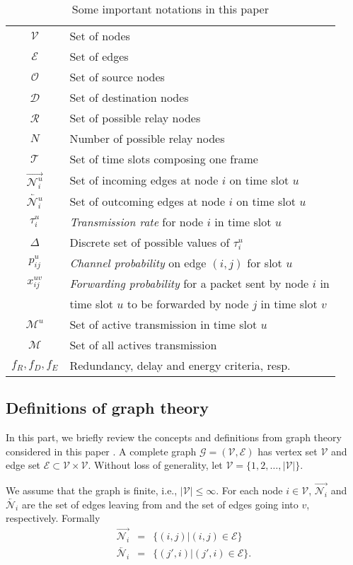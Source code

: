 \documentclass[a4paper]{article}
\newcommand{\T}{\mathcal{T}}
\newcommand{\M}{\mathcal{M}}
\newcommand{\V}{\mathcal{V}}
\newcommand{\Orig}{\mathcal{O}}
\newcommand{\D}{\mathcal{D}}
\newcommand{\E}{\mathcal{E}}
\newcommand{\R}{\mathcal{R}}
\newcommand{\Nout}[2]{ \overrightarrow{ \mathcal{N}_{#1}^{#2} } }
\newcommand{\Nin}[2]{ \overleftarrow{ \mathcal{N}_{#1}^{#2} } }
\begin{document}
\begin{table} 
\caption{Some important notations in this paper} 
\centering
\label{tab:notations}
\begin{tabular}{| c | l |}
\hline
$\V$			& Set of nodes \\
$\E$		& Set of edges \\
$\Orig$		& Set of source nodes \\
$\D$		& Set of destination nodes\\
$\R$		& Set of possible relay nodes\\
$N$				& Number of possible relay nodes\\
$\T$				& Set of time slots composing one frame\\
$\Nout{i}{u}$ 		& Set of incoming edges at node $i$  on time slot $u$\\
$\Nin{i}{u}$ 		& Set of outcoming edges at node $i$ on time slot $u$\\  
$\tau^u_i$		& \emph{Transmission rate} for node $i$ in time slot $u$ \\
$\Delta$			& Discrete set of possible values of  $\tau^u_i$\\			
$p_{ij}^u$ 		& \emph{Channel probability} on edge $(i,j)$ for slot $u$ \\ 
$x_{ij}^{uv}$		& \emph{Forwarding probability} for a packet sent by node $i$ in \\
				&  time slot $u$ to be forwarded by node $j$ in time slot $v$\\
$\M^u$			& Set of active transmission in time slot $u$\\
$\M$				& Set of all actives transmission \\
$f_R, f_D, f_E$		& Redundancy, delay and energy criteria, resp. \\
\hline

\end{tabular}
\end{table}

\subsection{Definitions of graph theory}

In this part, we briefly review the concepts and definitions from graph theory considered in this paper \cite{graph}. 
A complete graph $\mathcal{G=(V,E)}$ has vertex set $\V$ and edge set $\mathcal{E \subset V \times V}$. Without loss of generality, let
$ \V = \{1, 2, \dots, |\V| \} $.

We assume that the graph is finite, i.e., $|\V| \leq \infty$. 
For each node $i \in \V$, $\Nout{i}{}$ and $\Nin{i}{}$ are the set of edges leaving from and the set of edges going into $v$, respectively. Formally 
\begin{eqnarray*}
\Nout{i}{} 	& = &\{ (i,j) | (i,j) \in \E\}  \\
\Nin{i}{} 	& = &\{ (j',i) | (j',i) \in \E\}.
\end{eqnarray*}
\end{document}
